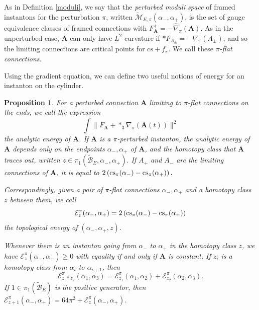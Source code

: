 \documentclass[10pt,a4paper]{amsart}
\newtheorem{proposition}[theorem]{Proposition}
\theoremstyle{definition}
\theoremstyle{remark}
\numberwithin{figure}{qchap}
\begin{document}
As in Definition \ref{moduli}, we say that the \textit{perturbed moduli space} of framed instantons for the perturbation $\pi$, written $\widetilde{\mathcal M}_{E,\pi}(\alpha_-, \alpha_+)$, is the set of gauge equivalence classes of framed connections with $F_{\mathbf{A}}^+ = - \widehat \nabla_\pi(\mathbf{A})$. As in the unperturbed case, $\mathbf{A}$ can only have $L^2$ curvature if $*F_{A_\pm} = - \nabla_\pi(A_{\pm})$, and so the limiting connections are critical points for $\text{cs}+f_\pi$. We call these \emph{$\pi$-flat connections}.

Using the gradient equation, we can define two useful notions of energy for an instanton on the cylinder.

\begin{proposition}\label{energy}For a perturbed connection $\mathbf{A}$ limiting to $\pi$-flat connections on the ends, we call the expression $$\int \|F_{\mathbf{A}} + *_3\nabla_\pi(\mathbf{A}(t))\|^2$$ the \emph{analytic energy} of $\mathbf{A}$. If $\mathbf{A}$ is a $\pi$-perturbed instanton, the analytic energy of $\mathbf{A}$ depends only on the endpoints $\alpha_-, \alpha_+$ of $\mathbf{A}$, and the homotopy class that $\mathbf{A}$ traces out, written $z \in \pi_1(\widetilde{\mathcal B}_E, \alpha_-, \alpha_+).$ If $A_+$ and $A_-$ are the limiting connections of $\mathbf{A}$, it is equal to $2\left(\textup{cs}_\pi(\alpha_-) - \textup{cs}_\pi(\alpha_+)\right).$ 

Correspondingly, given a pair of $\pi$-flat connections $\alpha_-, \alpha_+$ and a homotopy class $z$ between them, we call $$\mathcal E^\pi_z(\alpha_-, \alpha_+)=2\left(\textup{cs}_\pi(\alpha_-) - \textup{cs}_\pi(\alpha_+)\right)$$ the \textit{topological energy} of $(\alpha_-, \alpha_+, z)$. 

Whenever there is an instanton going from $\alpha_-$ to $\alpha_+$ in the homotopy class $z$, we have $\mathcal E^\pi_z(\alpha_-, \alpha_+) \geq 0$  with equality if and only if $\mathbf{A}$ is constant. If $z_i$ is a homotopy class from $\alpha_i$ to $\alpha_{i+1}$, then $$\mathcal E^\pi_{z_1 \ast z_2}(\alpha_1, \alpha_3) = \mathcal E^\pi_{z_1}(\alpha_1, \alpha_2) + \mathcal E^\pi_{z_2}(\alpha_2,\alpha_3).$$ If $1 \in \pi_1(\widetilde{\mathcal B}_E)$ is the positive generator, then $\mathcal E^\pi_{z+1}(\alpha_-, \alpha_+) = 64\pi^2 + \mathcal E^\pi_z(\alpha_-, \alpha_+)$. 
\end{proposition}
\end{document}
